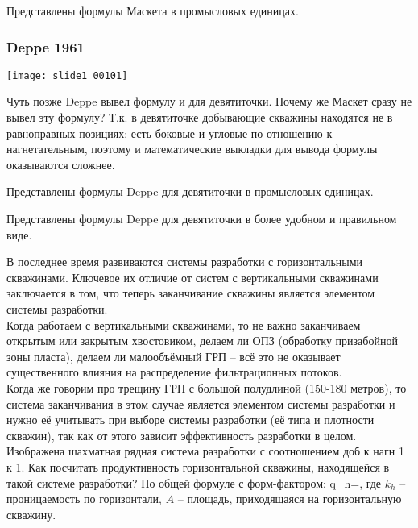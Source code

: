 \documentclass[main.tex]{subfiles}
\begin{document}

Представлены формулы Маскета в промысловых единицах.

\subsubsection{Deppe 1961}

\texttt{[image: slide1\_00101]}

Чуть позже Deppe вывел формулу и для девятиточки. Почему же Маскет сразу не вывел эту формулу? Т.к. в девятиточке добывающие скважины находятся не в равноправных позициях: есть боковые и угловые по отношению к нагнетательным, поэтому и математические выкладки для вывода формулы оказываются сложнее.


Представлены формулы Deppe для девятиточки в промысловых единицах.


Представлены формулы Deppe для девятиточки в более удобном и правильном виде.


В последнее время развиваются системы разработки с горизонтальными скважинами. Ключевое их отличие от систем с вертикальными скважинами заключается в том, что теперь заканчивание скважины является элементом системы разработки.\\

Когда работаем с вертикальными скважинами, то не важно заканчиваем открытым или закрытым хвостовиком, делаем ли ОПЗ (обработку призабойной зоны пласта), делаем ли малообъёмный ГРП -- всё это не оказывает существенного влияния на распределение фильтрационных потоков.\\

Когда же говорим про трещину ГРП с большой полудлиной (150-180 метров), то система заканчивания в этом случае является элементом системы разработки и нужно её учитывать при выборе системы разработки (её типа и плотности скважин), так как от этого зависит эффективность разработки в целом.\\

Изображена шахматная рядная система разработки с соотношением доб к нагн 1 к 1. Как посчитать продуктивность горизонтальной скважины, находящейся в такой системе разработки? По общей формуле с форм-фактором:
\beq
q_h=,
\eeq
где $k_h$ -- проницаемость по горизонтали, $A$ -- площадь, приходящаяся на горизонтальную скважину.\\
\end{document}
